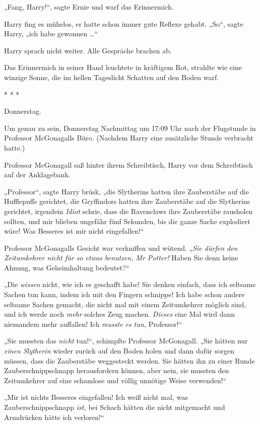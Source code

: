 {„Fang, Harry!“, sagte Ernie und warf das Erinnermich.

Harry fing es mühelos, er hatte schon immer gute Reflexe gehabt. „So“, sagte Harry, „ich habe gewonnen …“

Harry sprach nicht weiter. Alle Gespräche brachen ab.

Das Erinnermich in seiner Hand leuchtete in kräftigem Rot, strahlte wie eine winzige Sonne, die im hellen Tageslicht Schatten auf den Boden warf.

* * *

Donnerstag.

Um genau zu sein, Donnerstag Nachmittag um 17:09 Uhr nach der Flugstunde in Professor McGonagalls Büro. (Nachdem Harry eine zusätzliche Stunde verbracht hatte.)

Professor McGonagall saß hinter ihrem Schreibtisch, Harry vor dem Schreibtisch auf der Anklagebank.

„Professor“, sagte Harry brüsk, „die Slytherins hatten ihre Zauberstäbe auf die Hufflepuffs gerichtet, die Gryffindors hatten ihre Zauberstäbe auf die Slytherins gerichtet, irgendein \emph{Idiot} schrie, dass die Ravenclaws ihre Zauberstäbe rausholen sollten, und mir blieben ungefähr fünf Sekunden, bis die ganze Sache explodiert wäre! Was Besseres ist mir nicht eingefallen!“

Professor McGonagalls Gesicht war verkniffen und wütend. „\emph{Sie dürfen den Zeitumkehrer nicht für so etwas benutzen, Mr Potter!} Haben Sie denn keine Ahnung, was Geheimhaltung bedeutet?“

„Die \emph{wissen} nicht, wie ich es geschafft habe! Sie denken einfach, dass ich seltsame Sachen tun kann, indem ich mit den Fingern schnippe! Ich habe schon andere seltsame Sachen gemacht, die nicht mal mit einem Zeitumkehrer möglich sind, und ich werde noch \emph{mehr} solches Zeug machen. \emph{Dieses} eine Mal wird dann niemandem mehr auffallen! Ich \emph{musste es tun,} Professor!“

„Sie mussten das \emph{nicht} tun!“, schimpfte Professor McGonagall. „Sie hätten nur \emph{einen Slytherin} wieder zurück auf den Boden holen und dann dafür sorgen müssen, dass die Zauberstäbe weggesteckt werden. Sie hätten ihn zu einer Runde Zauberschnippschnapp herausfordern können, aber nein, sie mussten den Zeitumkehrer auf eine schamlose und völlig unnötige Weise verwenden!“

„Mir ist nichts Besseres eingefallen! Ich weiß nicht mal, was Zauberschnippschnapp \emph{ist,} bei Schach hätten die nicht mitgemacht und Armdrücken hätte ich verloren!“

}
